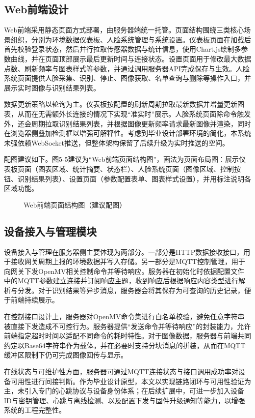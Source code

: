 \subsection{Web前端设计}
\par Web前端采用静态页面方式部署，由服务器端统一托管。页面结构围绕三类核心场景组织，分别为环境数据仪表板、人脸系统管理与系统设置。仪表板页面在加载后首先校验登录状态，然后并行拉取传感器数据与统计信息，使用Chart.js绘制多参数曲线，并在页面顶部展示最后更新时间与连接状态。设置页面用于修改最大数据点数、刷新频率与图表样式等参数，并通过调用服务器API完成保存与生效。人脸系统页面提供人脸采集、识别、停止、图像获取、名单查询与删除等操作入口，并展示实时图像与识别结果列表。
\par 数据更新策略以轮询为主。仪表板按配置的刷新周期拉取最新数据并增量更新图表，从而在无需额外长连接的情况下实现“准实时”展示。人脸系统页面除命令触发外，还会周期拉取识别结果列表，并根据图像更新频率请求最新图像并渲染，同时在浏览器侧叠加检测框以增强可解释性。考虑到毕业设计部署环境的简化，本系统未强依赖WebSocket推送，但整体架构保留了后续升级为实时推送的空间。

\par 配图建议如下。图5-5建议为“Web前端页面结构图”，画法为页面布局图：展示仪表板页面（图表区域、统计摘要、状态栏）、人脸系统页面（图像区域、控制按钮、识别结果列表）、设置页面（参数配置表单、图表样式设置），并用标注说明各区域功能。
\begin{figure}[H]
\centering
{}
\caption{Web前端页面结构图（建议配图）}
\label{fig:web_structure}
\end{figure}

\subsection{设备接入与管理模块}
\par 设备接入与管理在服务器侧主要体现为两部分。一部分是HTTP数据接收接口，用于接收网关周期上报的环境数据并写入存储。另一部分是MQTT控制管理，用于向网关下发OpenMV相关控制命令并等待响应。服务器在初始化时依据配置文件中的MQTT参数建立连接并订阅响应主题，收到响应后根据响应内容类型进行解析与分发。对于识别结果等异步消息，服务器会将其保存为可查询的历史记录，便于前端持续展示。
\par 在控制接口设计上，服务器对OpenMV命令集进行白名单校验，避免任意字符串被直接下发造成不可控行为。服务器提供“发送命令并等待响应”的封装能力，允许前端指定超时时间以适配不同命令的耗时特性。对于图像数据，服务器与前端共同约定以Base64字符串作为载体，并在必要时支持分块消息的拼装，从而在MQTT缓冲区限制下仍可完成图像回传与显示。
\par 在线状态与可维护性方面，服务器可通过MQTT连接状态与接口调用成功率对设备可用性进行间接判断。作为毕业设计原型，本文以实现链路闭环与可用性验证为主，未引入专门的心跳协议与设备身份体系；在后续扩展中，可进一步加入设备ID与密钥管理、心跳与离线检测、以及配置下发与固件升级通知等能力，以增强系统的工程完整性。

